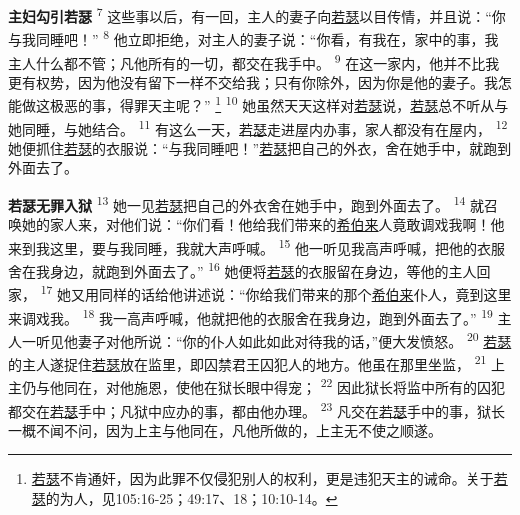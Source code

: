 \textbf{主妇勾引若瑟\quad}
\textsuperscript{7}
这些事以后，有一回，主人的妻子向\uline{若瑟}以目传情，并且说：“你与我同睡吧！”
\textsuperscript{8}
他立即拒绝，对主人的妻子说：“你看，有我在，家中的事，我主人什么都不管；凡他所有的一切，都交在我手中。
\textsuperscript{9}
在这一家内，他并不比我更有权势，因为他没有留下一样不交给我；只有你除外，因为你是他的妻子。我怎能做这极恶的事，得罪天主呢？”
\footnote{\uline{若瑟}不肯通奸，因为此罪不仅侵犯别人的权利，更是违犯天主的诫命。关于\uline{若瑟}的为人，见105:16-25；49:17、18；10:10-14。}
\textsuperscript{10}
她虽然天天这样对\uline{若瑟}说，\uline{若瑟}总不听从与她同睡，与她结合。
\textsuperscript{11}
有这么一天，\uline{若瑟}走进屋内办事，家人都没有在屋内，
\textsuperscript{12}
她便抓住\uline{若瑟}的衣服说：“与我同睡吧！”\uline{若瑟}把自己的外衣，舍在她手中，就跑到外面去了。

\textbf{若瑟无罪入狱\quad}
\textsuperscript{13}
她一见\uline{若瑟}把自己的外衣舍在她手中，跑到外面去了。
\textsuperscript{14}
就召唤她的家人来，对他们说：“你们看！他给我们带来的\uline{希伯来}人竟敢调戏我啊！他来到我这里，要与我同睡，我就大声呼喊。
\textsuperscript{15}
他一听见我高声呼喊，把他的衣服舍在我身边，就跑到外面去了。”
\textsuperscript{16}
她便将\uline{若瑟}的衣服留在身边，等他的主人回家，
\textsuperscript{17}
她又用同样的话给他讲述说：“你给我们带来的那个\uline{希伯来}仆人，竟到这里来调戏我。
\textsuperscript{18}
我一高声呼喊，他就把他的衣服舍在我身边，跑到外面去了。”
\textsuperscript{19}
主人一听见他妻子对他所说：“你的仆人如此如此对待我的话，”便大发愤怒。
\textsuperscript{20}
\uline{若瑟}的主人遂捉住\uline{若瑟}放在监里，即囚禁君王囚犯人的地方。他虽在那里坐监，
\textsuperscript{21}
上主仍与他同在，对他施恩，使他在狱长眼中得宠；
\textsuperscript{22}
因此狱长将监中所有的囚犯都交在\uline{若瑟}手中；凡狱中应办的事，都由他办理。
\textsuperscript{23}
凡交在\uline{若瑟}手中的事，狱长一概不闻不问，因为上主与他同在，凡他所做的，上主无不使之顺遂。

